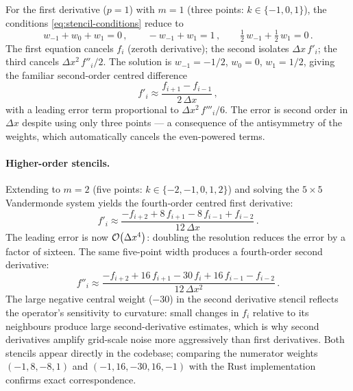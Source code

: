 For the first derivative ($p = 1$) with $m = 1$ (three points:
$k \in \{-1, 0, 1\}$), the conditions \cref{eq:stencil-conditions} reduce to
%
\begin{equation}
  w_{-1} + w_0 + w_1 = 0 \,, \qquad
  -w_{-1} + w_1 = 1 \,, \qquad
  \tfrac{1}{2}\,w_{-1} + \tfrac{1}{2}\,w_1 = 0 \,.
  \label{eq:second-order-d1-system}
\end{equation}
%
The first equation cancels $f_i$ (zeroth derivative); the second isolates
$\Delta x\,f'_i$; the third cancels $\Delta x^2\,f''_i/2$.  The solution is
$w_{-1} = -1/2$, $w_0 = 0$, $w_1 = 1/2$, giving the familiar second-order
centred difference
%
\begin{equation}
  f'_i \approx \frac{f_{i+1} - f_{i-1}}{2\,\Delta x} \,,
  \label{eq:d1-second-order}
\end{equation}
%
with a leading error term proportional to $\Delta x^2\,f'''_i / 6$.  The error
is second order in $\Delta x$ despite using only three points --- a
consequence of the antisymmetry of the weights, which automatically cancels the
even-powered terms.

\paragraph{Higher-order stencils.}

Extending to $m = 2$ (five points: $k \in \{-2, -1, 0, 1, 2\}$) and solving
the $5 \times 5$ Vandermonde system yields the fourth-order centred first
derivative:
%
\begin{equation}
  f'_i \approx \frac{-f_{i+2} + 8\,f_{i+1} - 8\,f_{i-1} + f_{i-2}}
  {12\,\Delta x} \,.
  \label{eq:d1-fourth-order}
\end{equation}
%
The leading error is now $\mathcal{O}\!\left(\Delta x^4\right)$: doubling the resolution reduces
the error by a factor of sixteen.  The same five-point width produces a
fourth-order second derivative:
%
\begin{equation}
  f''_i \approx \frac{-f_{i+2} + 16\,f_{i+1} - 30\,f_i + 16\,f_{i-1}
    - f_{i-2}}{12\,\Delta x^2} \,.
  \label{eq:d2-fourth-order}
\end{equation}
%
The large negative central weight ($-30$) in the second derivative stencil
reflects the operator's sensitivity to curvature: small changes in $f_i$
relative to its neighbours produce large second-derivative estimates, which
is why second derivatives amplify grid-scale noise more aggressively than
first derivatives.  Both stencils appear directly in the codebase; comparing
the numerator weights $(-1, 8, -8, 1)$ and $(-1, 16, -30, 16, -1)$ with
the Rust implementation confirms exact correspondence.

